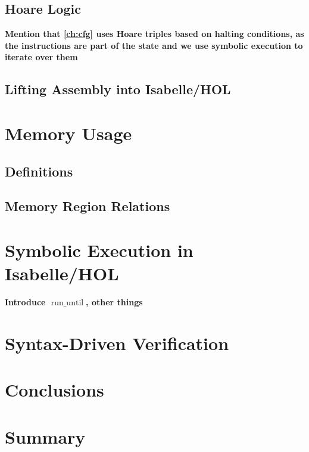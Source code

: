 \documentclass[nopageskip,prelim]{VTthesis} %
\DeclareMathOperator{\run}{run\_until}
\newcommand{\todo}[1]{{\bfseries\color{purple}#1}} %
\begin{document}
  \section{Hoare Logic}
  \todo{Mention that \cref{ch:cfg} uses Hoare triples based on halting conditions,
  as the instructions are part of the state and we use symbolic execution to iterate over them}
  \section{Lifting Assembly into Isabelle/HOL}
  
  \chapter{Memory Usage}
  \section{Definitions}
  \section{Memory Region Relations}
  
  \chapter{Symbolic Execution in Isabelle/HOL}
  \todo{Introduce $\run$, other things}

  
  
  \chapter{Syntax-Driven Verification} %

	\chapter{Conclusions}\label{ch:conclusions}
	\chapter{Summary}\label{ch:summary} %

	
	

  \clearpage{} %
  \printindex

	\appendix
\end{document}

